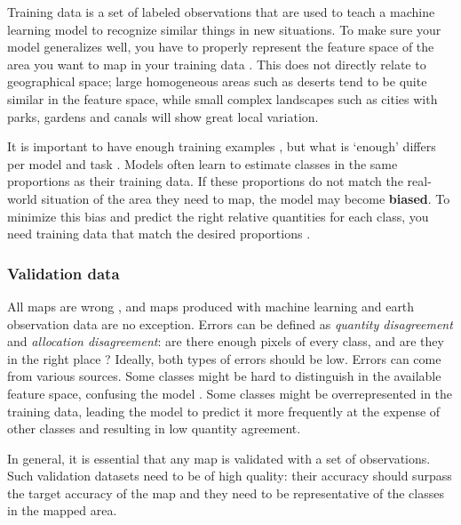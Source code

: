         Training data is a set of labeled observations that are used to teach a machine learning model to recognize similar things in new situations. To make sure your model generalizes well, you have to properly represent the feature space of the area you want to map in your training data \citep{meyer2021predicting}. This does not directly relate to geographical space; large homogeneous areas such as deserts tend to be quite similar in the feature space, while small complex landscapes such as cities with parks, gardens and canals will show great local variation. 

        It is important to have enough training examples \citep{ramezan2021effects,rodriguez-perez2017influence,zhu2016optimizing}, but what is `enough' differs per model \citep{myburgh2014impact} and task \citep{koshute2021recommending}. 
        Models often learn to estimate classes in the same proportions as their training data. If these proportions do not match the real-world situation of the area they need to map, the model may become \textbf{biased}. To minimize this bias and predict the right relative quantities for each class, you need training data that match the desired proportions \citep{he2009learning}.
        
    \subsubsection{Validation data}

        All maps are wrong \citep{monmonier2018how}, and maps produced with machine learning and earth observation data are no exception. Errors can be defined as \textit{quantity disagreement} and \textit{allocation disagreement}: are there enough pixels of every class, and are they in the right place \citep{pontius2006can,pontius2011death}? Ideally, both types of errors should be low. Errors can come from various sources. Some classes might be hard to distinguish in the available feature space, confusing the model \citep{shivakumar2017spectral}. Some classes might be overrepresented in the training data, leading the model to predict it more frequently at the expense of other classes and resulting in low quantity agreement.

        In general, it is essential that any map is validated with a set of observations. Such validation datasets need to be of high quality: their accuracy should surpass the target accuracy of the map and they need to be representative of the classes in the mapped area.
    
